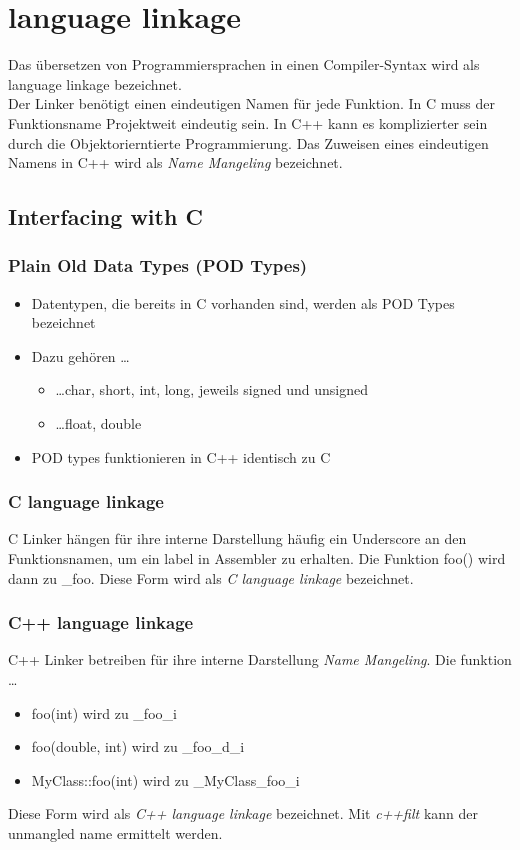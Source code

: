 \section{language linkage}
Das \"ubersetzen von Programmiersprachen in einen Compiler-Syntax wird als language linkage bezeichnet.\\
Der Linker ben\"otigt einen eindeutigen Namen f\"ur jede Funktion. In C muss der Funktionsname 
Projektweit eindeutig sein. In C++ kann es komplizierter sein durch die Objektorierntierte Programmierung. 
Das Zuweisen eines eindeutigen Namens in C++ wird als \textit{Name Mangeling} bezeichnet.

\subsection{Interfacing with C}
\subsubsection{Plain Old Data Types (POD Types)}
\begin{itemize}
    \item Datentypen, die bereits in C vorhanden sind, werden als POD Types bezeichnet
    \item Dazu geh\"oren \dots
    \begin{itemize}
        \item \dots char, short, int, long, jeweils signed und unsigned
        \item \dots float, double
    \end{itemize}
    \item POD types funktionieren in C++ identisch zu C
\end{itemize}

\begin{multicols}{2}
    \subsubsection{C language linkage}
C Linker h\"angen f\"ur ihre interne Darstellung h\"aufig ein Underscore an den Funktionsnamen, 
um ein label in Assembler zu erhalten. Die Funktion foo() wird dann zu \_foo. 
Diese Form wird als \textit{C language linkage} bezeichnet.
    \vfill\null
    \columnbreak
    \subsubsection{C++ language linkage}
C++ Linker betreiben f\"ur ihre interne Darstellung \textit{Name Mangeling}. 
Die funktion \dots 
\begin{itemize}
    \item foo(int) wird zu \_foo\_i
    \item foo(double, int) wird zu \_foo\_d\_i
    \item MyClass::foo(int) wird zu \_MyClass\_foo\_i
\end{itemize}
Diese Form wird als \textit{C++ language linkage} bezeichnet. Mit \textit{c++filt} kann 
der unmangled name ermittelt werden.
\end{multicols}

